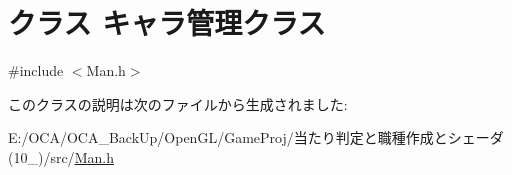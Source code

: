 \hypertarget{class_xE3_x82_xAD_xE3_x83_xA3_xE3_x83_xA9_xE7_xAE_xA1_xE7_x90_x86_xE3_x82_xAF_xE3_x83_xA9_xE3_x82_xB9}{\section{クラス キャラ管理クラス}
\label{class_xE3_x82_xAD_xE3_x83_xA3_xE3_x83_xA9_xE7_xAE_xA1_xE7_x90_x86_xE3_x82_xAF_xE3_x83_xA9_xE3_x82_xB9}
}


{\ttfamily \#include $<$Man.\-h$>$}



このクラスの説明は次のファイルから生成されました\-:\begin{DoxyCompactItemize}
\item 
E\-:/\-O\-C\-A/\-O\-C\-A\-\_\-\-Back\-Up/\-Open\-G\-L/\-Game\-Proj/当たり判定と職種作成とシェーダ(10\-\_)/src/\hyperlink{_man_8h}{Man.\-h}\end{DoxyCompactItemize}
